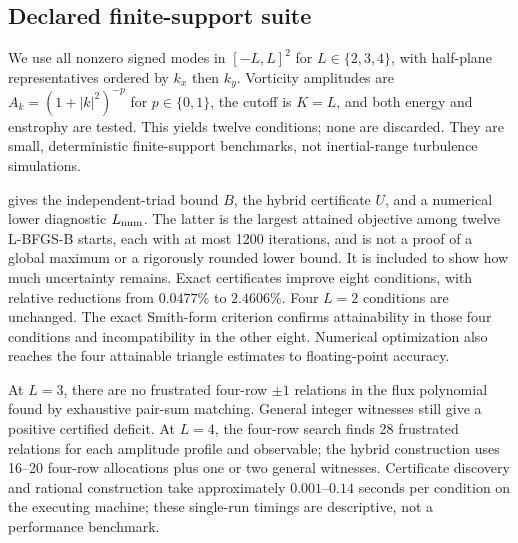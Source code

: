 \documentclass[11pt]{article}
\begin{document}
\subsection{Declared finite-support suite}
We use all nonzero signed modes in $[-L,L]^2$ for $L\in\{2,3,4\}$, with half-plane representatives ordered by $k_x$ then $k_y$. Vorticity amplitudes are $A_k=(1+|k|^2)^{-p}$ for $p\in\{0,1\}$, the cutoff is $K=L$, and both energy and enstrophy are tested. This yields twelve conditions; none are discarded. They are small, deterministic finite-support benchmarks, not inertial-range turbulence simulations.

 gives the independent-triad bound $B$, the hybrid certificate $U$, and a numerical lower diagnostic $L_{\rm num}$. The latter is the largest attained objective among twelve L-BFGS-B starts, each with at most 1200 iterations, and is not a proof of a global maximum or a rigorously rounded lower bound. It is included to show how much uncertainty remains. Exact certificates improve eight conditions, with relative reductions from $0.0477\%$ to $2.4606\%$. Four $L=2$ conditions are unchanged. The exact Smith-form criterion confirms attainability in those four conditions and incompatibility in the other eight. Numerical optimization also reaches the four attainable triangle estimates to floating-point accuracy.

At $L=3$, there are no frustrated four-row $\pm1$ relations in the flux polynomial found by exhaustive pair-sum matching. General integer witnesses still give a positive certified deficit. At $L=4$, the four-row search finds 28 frustrated relations for each amplitude profile and observable; the hybrid construction uses 16--20 four-row allocations plus one or two general witnesses. Certificate discovery and rational construction take approximately $0.001$--$0.14$ seconds per condition on the executing machine; these single-run timings are descriptive, not a performance benchmark.
\end{document}
